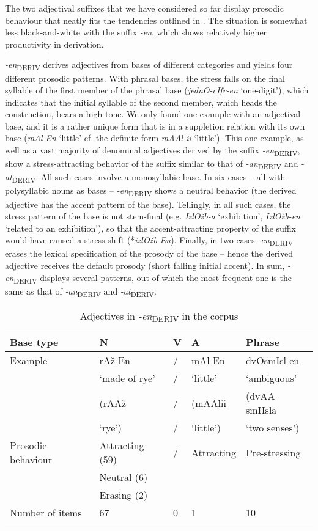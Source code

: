 \documentclass[output=paper]{langsci/langscibook}
\begin{document}
The two adjectival suffixes that we have considered so far display prosodic behaviour that neatly fits the tendencies outlined in . The situation is somewhat less black-and-white with the suffix \textit{-en}, which shows relatively higher productivity in derivation. 

\textit{-en}\textsubscript{DERIV} derives adjectives from bases of different categories and yields four different prosodic patterns. With phrasal bases, the stress falls on the final syllable of the first member of the phrasal base (\textit{jednO-cIfr-en} `one-digit'), which indicates that the initial syllable of the second member, which heads the construction, bears a high tone. We only found one example with an adjectival base, and it is a rather unique form that is in a suppletion relation with its own base (\textit{mAl-En} `little' cf. the definite form \textit{mAAl-ii} `little'). This one example, as well as a vast majority of denominal adjectives derived by the suffix \textit{{-en}}\textsubscript{DERIV}, show a stress-attracting behavior of the suffix similar to that of {\textit{{-an}}}\textsubscript{DERIV} and {\textit{{-at}}}\textsubscript{DERIV}. All such cases involve a monosyllabic base. In six cases – all with polysyllabic nouns as bases – {\textit{{-en}}}\textsubscript{DERIV} shows a neutral behavior (the derived adjective has the accent pattern of the base). Tellingly, in all such cases, the stress pattern of the base is not stem-final (e.g. \textit{IzlOžb-a} `exhibition', \textit{IzlOžb-en} `related to an exhibition'), so that the accent-attracting property of the suffix would have caused a stress shift (*\textit{izlOžb-En}). Finally, in two cases {\textit{{-en}}}\textsubscript{DERIV} erases the lexical specification of the prosody of the base – hence the derived adjective receives the default prosody (short falling initial accent). In sum, {\textit{{-en}}}\textsubscript{DERIV} displays several patterns, out of which the most frequent one is the same as that of {\textit{{-an}}}\textsubscript{DERIV} and {\textit{{-at}}}\textsubscript{DERIV}. 

\begin{table}
\caption{Adjectives in \textit{-en}\textsubscript{DERIV} in the corpus}
\label{tab1_d}
 \begin{tabular}{ l l l l l}
\lsptoprule  
 Base type & N & V & A & Phrase\\ %
\midrule
Example  &  rAž-En & / & mAl-En &  dvOsmIsl-en   \\
& `made of rye' & / & `little' & `ambiguous'  \\
& (rAAž  & / & (mAAlii  & (dvAA smIIsla \\
& `rye') & / & `little') & `two senses')\smallskip\\ 
Prosodic behaviour & Attracting (59) & / & Attracting & Pre-stressing\\ 
& Neutral (6)&&&\\ 
& Erasing (2)\smallskip&&&\\
 Number of items & 67 & 0 & 1 & 10\\
 \lspbottomrule
 \end{tabular}
\end{table}
\end{document}
